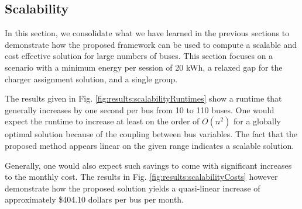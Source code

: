 \subsection{Scalability}
In this section, we consolidate what we have learned in the previous sections to demonstrate how the proposed framework can be used to compute a scalable and cost effective solution for large numbers of buses. This section focuses on a scenario with a minimum energy per session of 20 kWh, a relaxed gap for the charger assignment solution, and a single group.
\par The results given in Fig. \ref{fig:results:scalabilityRuntimes} show a runtime that generally increases by one second per bus from 10 to 110 buses.  One would expect the runtime to increase at least on the order of $O(n^2)$ for a globally optimal solution because of the coupling between bus variables. The fact that the proposed method appears linear on the given range indicates a scalable solution. 
\par Generally, one would also expect such savings to come with significant increases to the monthly cost. The results in Fig. \ref{fig:results:scalabilityCosts} however demonstrate how the proposed solution yields a quasi-linear increase of approximately \$404.10 dollars per bus per month. 


	
	
